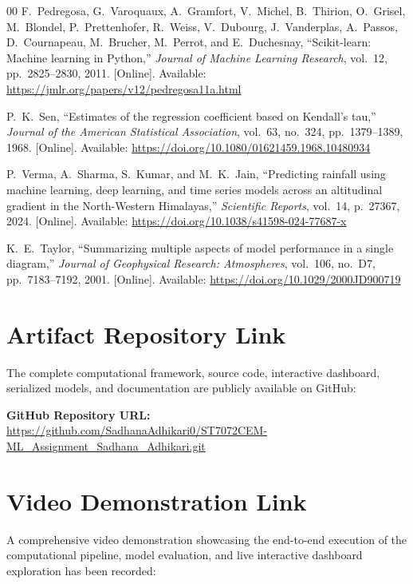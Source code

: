 \documentclass[conference]{IEEEtran}
\providecommand{\appendices}{\appendix}
\begin{document}
\begin{thebibliography}{00}
F.~Pedregosa, G.~Varoquaux, A.~Gramfort, V.~Michel, B.~Thirion, O.~Grisel, M.~Blondel, P.~Prettenhofer, R.~Weiss, V.~Dubourg, J.~Vanderplas, A.~Passos, D.~Cournapeau, M.~Brucher, M.~Perrot, and E.~Duchesnay, ``Scikit-learn: Machine learning in Python,'' \emph{Journal of Machine Learning Research}, vol.~12, pp.~2825--2830, 2011. [Online]. Available: \url{https://jmlr.org/papers/v12/pedregosa11a.html}

P.~K.~Sen, ``Estimates of the regression coefficient based on Kendall's tau,'' \emph{Journal of the American Statistical Association}, vol.~63, no.~324, pp.~1379--1389, 1968. [Online]. Available: \url{https://doi.org/10.1080/01621459.1968.10480934}

P.~Verma, A.~Sharma, S.~Kumar, and M.~K.~Jain, ``Predicting rainfall using machine learning, deep learning, and time series models across an altitudinal gradient in the North-Western Himalayas,'' \emph{Scientific Reports}, vol.~14, p.~27367, 2024. [Online]. Available: \url{https://doi.org/10.1038/s41598-024-77687-x}

K.~E.~Taylor, ``Summarizing multiple aspects of model performance in a single diagram,'' \emph{Journal of Geophysical Research: Atmospheres}, vol.~106, no.~D7, pp.~7183--7192, 2001. [Online]. Available: \url{https://doi.org/10.1029/2000JD900719}

\end{thebibliography}

\appendices
\setlength{\fboxsep}{1.5pt}
\section{Artifact Repository Link}
\label{app:github}
The complete computational framework, source code, interactive dashboard, serialized models, and documentation are publicly available on GitHub:

\noindent\textbf{GitHub Repository URL:} \\
\url{https://github.com/SadhanaAdhikari0/ST7072CEM-ML_Assignment_Sadhana_Adhikari.git}

\section{Video Demonstration Link}
\label{app:video}
A comprehensive video demonstration showcasing the end-to-end execution of the computational pipeline, model evaluation, and live interactive dashboard exploration has been recorded:
\end{document}
